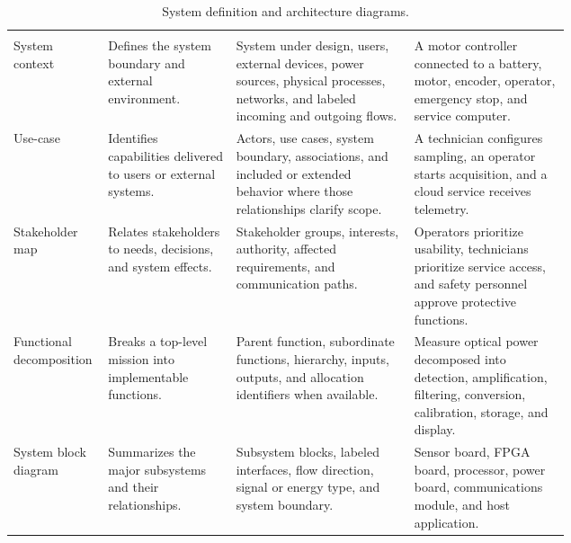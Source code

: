 
\begin{singlespace}
\setlength{\LTcapwidth}{\linewidth}
\begin{longtable}{@{}L{0.17\linewidth} L{0.23\linewidth} L{0.32\linewidth} L{\tabcolsep\relax}@{}}
\caption{System definition and architecture diagrams.}\label{tab:system-architecture-diagrams}\\
 &  &  &  \\
\midrule
\endfirsthead
{}
 &  &  &  \\
\midrule
\endhead
\bottomrule
\endfoot
System context & Defines the system boundary and external environment. & System under design, users, external devices, power sources, physical processes, networks, and labeled incoming and outgoing flows. & A motor controller connected to a battery, motor, encoder, operator, emergency stop, and service computer. \\
\addlinespace[3pt]
Use-case & Identifies capabilities delivered to users or external systems. & Actors, use cases, system boundary, associations, and included or extended behavior where those relationships clarify scope. & A technician configures sampling, an operator starts acquisition, and a cloud service receives telemetry. \\
\addlinespace[3pt]
Stakeholder map & Relates stakeholders to needs, decisions, and system effects. & Stakeholder groups, interests, authority, affected requirements, and communication paths. & Operators prioritize usability, technicians prioritize service access, and safety personnel approve protective functions. \\
\addlinespace[3pt]
Functional decomposition & Breaks a top-level mission into implementable functions. & Parent function, subordinate functions, hierarchy, inputs, outputs, and allocation identifiers when available. & Measure optical power decomposed into detection, amplification, filtering, conversion, calibration, storage, and display. \\
\addlinespace[3pt]
System block diagram & Summarizes the major subsystems and their relationships. & Subsystem blocks, labeled interfaces, flow direction, signal or energy type, and system boundary. & Sensor board, FPGA board, processor, power board, communications module, and host application. \\

\end{longtable}
\end{singlespace}
